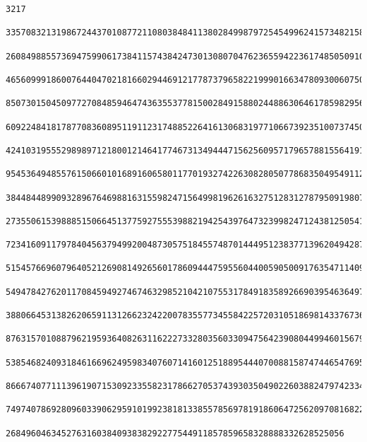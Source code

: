 \documentclass[11pt,twoside,openany]{memoir}
\begin{document}
\begin{tcolorbox}
\begin{Verbatim}[fontsize=\tiny]
    3217
    33570832131986724437010877211080384841138028499879725454996241573482158450444042882048778809437690388449535774
    26084988557369475990617384115743842473013080704762365594223617485050910853782765859064232548249476147319657907
    46560999186007644047021816602944691217787379658221999016634780930060750223592232018499856361441771859254020781
    85073015045097727084859464743635537781500284915880244886306461785982956072060013474955617851481680185988557136
    60922484181787708360895119112317488522641613068319771066739235100737450375540335253147622794359007165170269759
    42410319555298989712180012146417746731349444715625609571796578815564191221029354502997518133405151709561679510
    95453649485576150660101689160658011770193274226308280507786835049549112576654510119670456745939890194205255175
    38448448990932896764698816315598247156499819626163275128312787950919807425319340958045456248866438346537988500
    27355061539888515066451377592755539882194254397647323998247124381250541175238374382567444370550194410510064899
    72341609117978404563794992004873057518455748701444951238377139620494287982489529827233140637014837408856156199
    51545766960796405212690814926560178609444759556044005905009176354711409225537139742580786755435211254219478481
    54947842762011708459492746746329852104210755317849183589266903954636497214522654057134843880439116344854323586
    38806645313826206591131266232422007835577345584225720310518698143376736219283021119287617896146885584860065048
    87631570108879621959364082631162227332803560330947564239080449946015679785536101824669610125392225456724090831
    53854682409318461669624959834076071416012518895444070088158747446547695072686780517577469568912124854562611213
    86667407711139619071530923355823178662705374393035049022603882479742334799407130280148769298597743778193050348
    74974078692809603390629591019923818133855785697819186064725620970816822911615630097805919702685572687764976707
    2684960463452763160384093838292277544911857859658328888332628525056

\end{Verbatim}
\end{tcolorbox}
\end{document}
